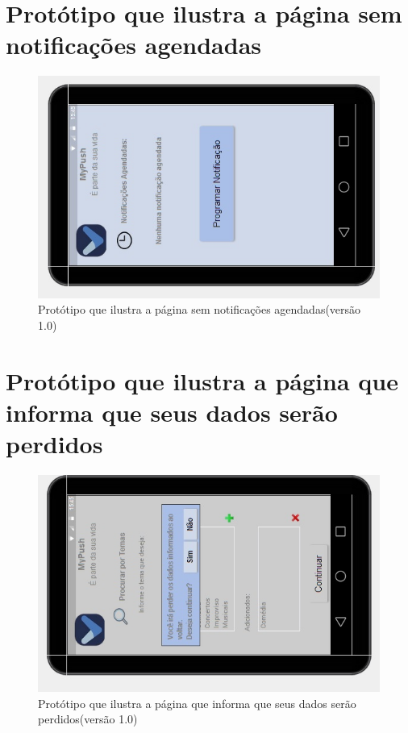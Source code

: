 \begin{apendicesenv}
      \section*{Protótipo que ilustra a página sem notificações agendadas}

    \begin{figure}[!htbp]
      \centering
      \includegraphics[scale=0.5, angle=-90]{editaveis/figuras/prototipo_alta_fidelidade_v1/1_9}
      \caption{Protótipo que ilustra a página sem notificações agendadas(versão 1.0)}
      \label{v1}
    \end{figure}
    
      \section*{Protótipo que ilustra a página que informa que seus dados serão perdidos}

    \begin{figure}[!htbp]
      \centering
      \includegraphics[scale=0.5, angle=-90]{editaveis/figuras/prototipo_alta_fidelidade_v1/1_10}
      \caption{Protótipo que ilustra a página que informa que seus dados serão perdidos(versão 1.0)}
      \label{v1}
    \end{figure}
    

\end{apendicesenv}
